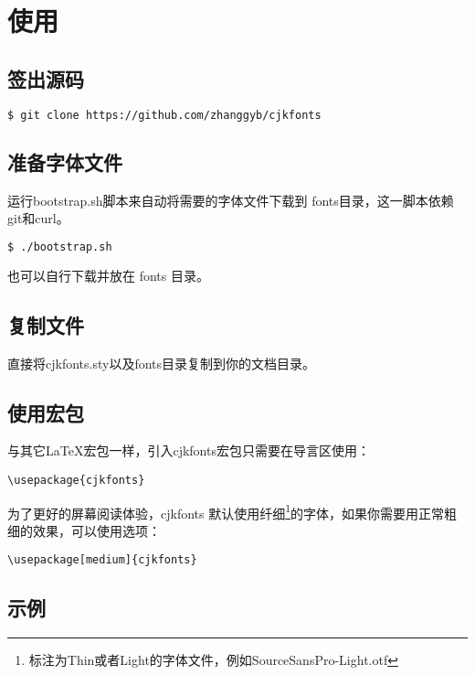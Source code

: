 \documentclass[oneside,final]{article}
\begin{document}
\section{使用}

\subsection{签出源码}

\begin{lstlisting}[language=sh]
$ git clone https://github.com/zhanggyb/cjkfonts
\end{lstlisting}

\subsection{准备字体文件}

运行{\SourceCodePro bootstrap.sh}脚本来自动将需要的字体文件下载到
{\SourceCodePro fonts}目录，这一脚本依赖git和curl。

\begin{lstlisting}[language=sh]
$ ./bootstrap.sh
\end{lstlisting}

也可以自行下载并放在 fonts 目录。

\subsection{复制文件}

直接将{\SourceCodePro cjkfonts.sty}以及{\SourceCodePro fonts}目录复制到你的文档目录。

\subsection{使用宏包}

与其它\LaTeX{}宏包一样，引入{\SourceCodePro cjkfonts}宏包只需要在导言区使用：

\begin{lstlisting}
\usepackage{cjkfonts}
\end{lstlisting}

为了更好的屏幕阅读体验，cjkfonts 默认使用纤细\footnote{标注为Thin或者Light的字体文件，例如SourceSansPro-Light.otf}的字体，如果你需要用正常粗细的效果，可以使用选项：

\begin{lstlisting}
\usepackage[medium]{cjkfonts}
\end{lstlisting}

\subsection{示例}
\end{document}
